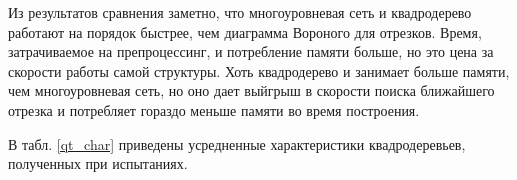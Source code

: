 \begin{table}[ht]
\centering
\renewcommand{\arraystretch}{1.1}
\end{table}

\FloatBarrier
Из результатов сравнения заметно, что многоуровневая сеть и
квадродерево работают на порядок быстрее, чем диаграмма Вороного для отрезков. Время, затрачиваемое на
препроцессинг, и потребление памяти больше, но это цена за скорости работы самой структуры.
Хоть квадродерево и занимает больше памяти, чем многоуровневая сеть, но
оно дает выйгрыш в скорости поиска ближайшего отрезка и потребляет гораздо 
меньше памяти во время построения.

В табл. \ref{qt_char} приведены усредненные характеристики квадродеревьев,
полученных при испытаниях.


\begin{table}[ht]
\centering
\renewcommand{\arraystretch}{1.1}
\end{table}

\FloatBarrier
